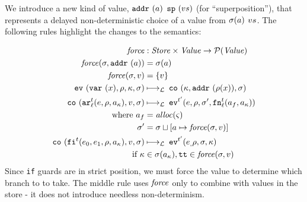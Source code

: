 \documentclass[preprint,onecolumn,9pt]{sigplanconf} %
\begin{document}
We introduce a new kind of value,
\spchoice
{${\tt addr}{\ }({a})$}
{${\tt sp}{\ }({v{s}})$ (for ``superposition'')},
%
that represents a delayed non-deterministic choice of a value from
\spchoice
{$\sigma(a)$}
{$v{s}$}.
%
The following rules highlight the changes to the semantics:

\renewcommand{\ext}{\mathit{ext}}

\begin{align*}
\spchoice
{\force &: \Store \times \Value \to \Set(\Value) \\
 \force(\msto,\saddr{\maddr}) &= \msto(\maddr) \\
 \force(\msto,\mval) &= \setof{\mval}}
{\force &: \Value \to \Set(\Value) \\
 \force(\superposition{\mval{s}}) &= \mval{s} \\
 \force(\mval) &= \{\mval\}}
\\
%
\ev{\svar{\mvar},\menv,\mkont,\msto} &\lmachstep\;
\spchoice
{\co{\mkont,\saddr{\menv(\mvar)},\msto}}
{\co{\mkont,\superposition{\msto(\menv(\mvar))},\msto}} \\
%
\co{\kar[^\mcntr_\mlab]{\mexp,\menv,\maddr_\mkont},\mval,\msto}
&\lmachstep\;
\ev[^{\mcntr'}]{\mexp,\menv,\msto',\kfn[^\mcntr_\mlab]{\maddr_f,\maddr_\mkont}} \\
\text{ where }
\maddr_f &= \alloc(\mstate) \\
\msto' &=
\spchoice
{\msto \sqcup[\maddr \mapsto \force(\msto,\mval)]}
{\msto \sqcup[\maddr \mapsto \force(\mval)]} \\
%
\co{\kif[^\mcntr]{\mexpi0,\mexpi1,\menv,\maddr_\mkont},\mval,\msto}
&\lmachstep\;
\ev[^{\mcntr'}]{\mexpi,\menv,\msto,\mkont} \\
\text{ if } \mkont &\in \msto(\maddr_\mkont),
            \strue \in \spchoice{\force(\msto,\mval)}{\force(\mval)}
\end{align*}
Since {\tt if} guards are in strict position, we must force the value
to determine which branch to to take. The middle rule uses $\mathit{force}$
only to combine with values in the store - it does not introduce
needless non-determinism.
\end{document}

